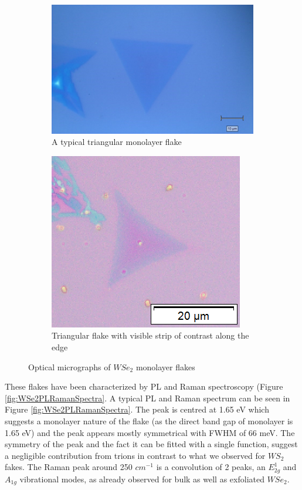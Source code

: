 \begin{figure}[H]
\begin{center}
	\begin{subfigure}[b]{0.4\textwidth}
		\includegraphics[scale=0.35]{WSe2/OMMap.png}
		\caption{A typical triangular monolayer flake}
		\label{fig:WSe2OMMap}
	\end{subfigure}
	\qquad
	\begin{subfigure}[b]{0.4\textwidth}
		\includegraphics[scale=0.5]{WSe2/OMMap2.png}
		\caption{Triangular flake with visible strip of contrast along the edge}
		\label{fig:WSe2OMMap2}
	\end{subfigure}
	\caption{Optical micrographs of $WSe_2$ monolayer flakes}
\end{center}
\end{figure}

These flakes have been characterized by PL and Raman spectroscopy (Figure \ref{fig:WSe2PLRamanSpectra}. A typical PL and Raman spectrum can be seen in Figure \ref{fig:WSe2PLRamanSpectra}. The peak is centred at 1.65 eV which suggests a monolayer nature of the flake (as the direct band gap of monolayer is 1.65 eV) and the peak appears mostly symmetrical with FWHM of 66 meV. The symmetry of the peak and the fact it can be fitted with a single function, suggest a negligible contribution from trions in contrast to what we observed for $WS_2$  fakes. The Raman peak around 250 $cm^{-1}$ is a convolution of 2 peaks, an $E^1_{2g}$ and $A_{1g}$ vibrational modes, as already observed for bulk as well as exfoliated $WSe_2$.

